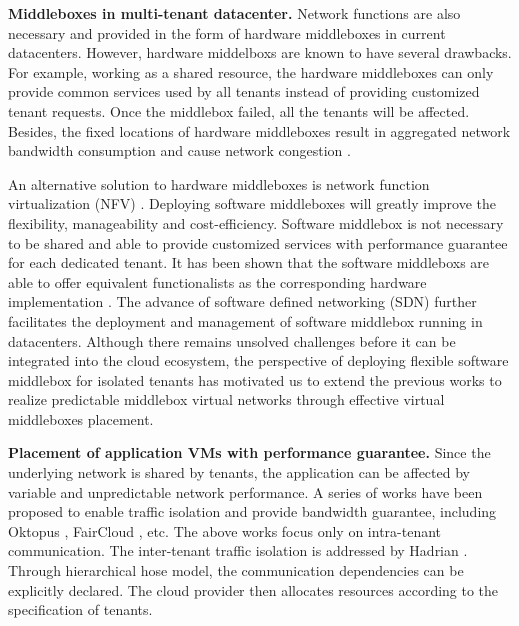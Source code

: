 \documentclass[review]{elsarticle}
\begin{document}
\textbf{Middleboxes in multi-tenant datacenter. }
Network functions are also necessary and provided in the form of hardware middleboxes in current datacenters.  However, hardware middelboxs are known to have several drawbacks. For example, working as a shared resource, the hardware middleboxes can only provide common services used by all tenants instead of providing customized tenant requests. Once the middlebox failed, all the tenants will be affected. Besides, the fixed locations of hardware middleboxes result in aggregated network bandwidth consumption and cause network congestion \cite{ClickOS, Y15NFV}. 

An alternative solution to hardware middleboxes is network function virtualization (NFV) \cite{NFV}. Deploying software middleboxes will greatly improve the flexibility, manageability and cost-efficiency. Software middlebox is not necessary to be shared and able to provide customized services with performance guarantee for each dedicated tenant. It has been shown that the software middleboxs are able to offer equivalent functionalists as the corresponding hardware implementation \cite{D12tpp, S12dai, G13dio, ClickOS}. The advance of software defined networking (SDN) further facilitates the deployment and management of software middlebox running in datacenters. Although there remains unsolved challenges before it can be integrated into the cloud ecosystem, the perspective of deploying flexible software middlebox for isolated tenants has motivated us to extend the previous works to realize predictable middlebox virtual networks through effective virtual middleboxes placement.


\textbf{Placement of application VMs with performance guarantee.}
Since the underlying network is shared by tenants, the application can be affected by variable and unpredictable network performance. A series of works have been proposed to enable traffic isolation and provide bandwidth guarantee, including Oktopus \cite{B11tpd}, FairCloud \cite{P12fst}, etc. The above works focus only on intra-tenant communication. The inter-tenant traffic isolation is addressed by Hadrian \cite{B13cta}. Through hierarchical hose model, the communication dependencies can be explicitly declared. The cloud provider then allocates resources according to the specification of tenants. 
\end{document}
